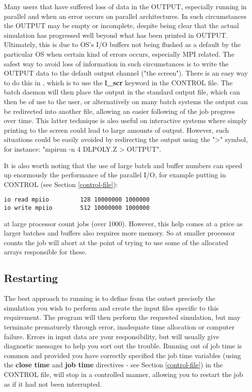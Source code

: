 Many users that have suffered loss of data in the OUTPUT, especially
running in parallel and when an error occurs on parallel architectures.
In such circumstances the OUTPUT may be empty or incomplete, despite
being clear that the actual simulation has progressed well beyond what
has been printed in OUTPUT.  Ultimately, this is due to OS's I/O
buffers not being flushed as a default by the particular OS when
certain kind of errors occurs, especially MPI related.  The safest way
to avoid loss of information in such circumstances is to write the
OUTPUT data to the default output channel ("the screen").  There is an
easy way to do this in \D, which is to use the {\bf l\_scr} keyword in
the CONTROL file.  The batch daemon will then place the output in the
standard output file, which can then be of use to the user, or
alternatively on many batch systems the output can be redirected into
another file, allowing an easier following of the job progress over
time.  This latter technique is also useful on interactive systems
where simply printing to the screen could lead to large amounts of
output.  However, such situations could be easily avoided by
redirecting the output using the ">" symbol, for instance:
"mpirun -n 4 DLPOLY.Z > OUTPUT".

It is also worth noting that the use of large batch and buffer
numbers can speed up enormously the performance of the parallel I/O,
for example putting in CONTROL (see Section \ref{control-file}):
\begin{verbatim}
io read mpiio         128 10000000 1000000
io write mpiio        512 10000000 1000000
\end{verbatim}
at large processor count jobs (over 1000).  However, this help comes
at a price as larger batches and buffers also requires more memory.
So at smaller processor counts the job will abort at the point of
trying to use some of the allocated arrays responsible for these.

\subsection{Restarting}

The best approach to running \D is to define from the outset
precisely the simulation you wish to perform and create the input
files specific to this requirement.  The program will then perform
the requested simulation, but may terminate prematurely through
error, inadequate time allocation or computer failure.  Errors in
input data are your responsibility, but \D will usually give
diagnostic messages to help you sort out the trouble.  Running out
of job time is common and provided you have correctly specified
the job time variables (using the {\bf close time} and {\bf job
time} directives - see Section \ref{control-file}) in the CONTROL
file, \D will stop in a controlled manner, allowing you to restart
the job as if it had not been interrupted.

